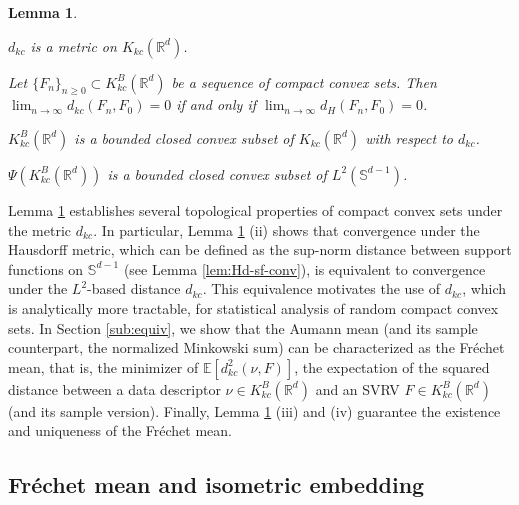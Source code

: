 \documentclass[11pt,reqno]{amsart}
\newtheorem{lemma}{Lemma}
\begin{document}
\begin{lemma}\label{lem:d}
\quad
    \item[(i)] $d_{kc}$ is a metric on $K_{kc}(\mathbb{R}^d)$.
    \item[(ii)] Let $\{F_n\}_{n \geq 0} \subset K_{kc}^B(\mathbb{R}^d)$ be a sequence of compact convex sets. Then $\lim_{n \to \infty}d_{kc}(F_n, F_0) = 0$ if and only if $\lim_{n \to \infty}d_H(F_n, F_0) = 0$.
    \item[(iii)] $K_{kc}^B(\mathbb{R}^d)$ is a bounded closed convex subset of $K_{kc}(\mathbb{R}^d)$ with respect to $d_{kc}$. 
    \item[(iv)] $\Psi(K_{kc}^B(\mathbb{R}^d))$ is a bounded closed convex subset of $L^2(\mathbb{S}^{d-1})$. 
\end{lemma}
Lemma \ref{lem:d} establishes several topological properties of compact convex sets under the metric $d_{kc}$.
In particular, Lemma \ref{lem:d} (ii) shows that convergence under the Hausdorff metric, which can be defined as the sup-norm distance between support functions on $\mathbb{S}^{d-1}$ (see Lemma \ref{lem:Hd-sf-conv}), is equivalent to convergence under the $L^2$-based distance $d_{kc}$. This equivalence motivates the use of $d_{kc}$, which is analytically more tractable, for statistical analysis of random compact convex sets. In Section \ref{sub:equiv}, we show that the Aumann mean (and its sample counterpart, the normalized Minkowski sum) can be characterized as the Fr\'echet mean, that is, the minimizer of $\mathbb{E}[d_{kc}^2(\nu,F)]$, the expectation of the squared distance between a data descriptor $\nu \in K_{kc}^B(\mathbb{R}^d)$ and an SVRV $F\in K_{kc}^B(\mathbb{R}^d)$ (and its sample version). Finally, Lemma \ref{lem:d} (iii) and (iv) guarantee the existence and uniqueness of the Fr\'echet mean.

\subsection{Fr\'echet mean and isometric embedding}\label{sub:Frechet}
\end{document}
